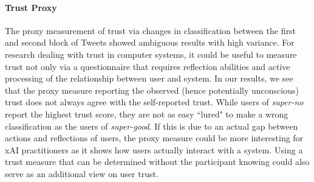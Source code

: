 \paragraph{Trust Proxy}
The proxy measurement of trust via changes in classification between the first and second block of Tweets showed ambiguous results with high variance. For research dealing with trust in computer systems, it could be useful to measure trust not only via a questionnaire that requires reflection abilities and active processing of the relationship between user and system. In our results, we see that the proxy measure reporting the observed (hence potentially unconscious) trust does not always agree with the self-reported trust. While users of \textit{super-no} report the highest trust score, they are not as easy ``lured" to make a wrong classification as the users of \textit{super-good}. If this is due to an actual gap between actions and reflections of users, the proxy measure could be more interesting for xAI practitioners as it shows how users actually interact with a system. Using a trust measure that can be determined without the participant knowing could also serve as an additional view on user trust.\medskip \newline
